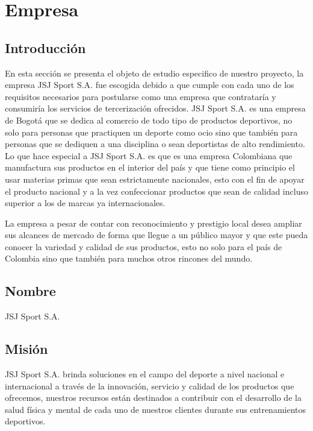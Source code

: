 \chapter{Empresa}

\section{Introducción}

En esta sección se presenta el objeto de estudio especifico de nuestro proyecto, la empresa JSJ Sport S.A. fue escogida debido a que cumple con cada uno de los requisitos necesarios para postularse como una empresa que contrataría y consumiría los servicios de tercerización ofrecidos.
\newline
JSJ Sport S.A. es una empresa de Bogotá que se dedica al comercio de todo tipo de productos deportivos, no solo para personas que practiquen un deporte como ocio sino que también para personas que se dediquen a una disciplina o sean deportistas de alto rendimiento.
Lo que hace especial a JSJ Sport S.A. es que es una empresa Colombiana que manufactura sus productos en el interior del país y que tiene como principio el usar materias primas que sean estrictamente nacionales, esto con el fin de apoyar el producto nacional y a la vez confeccionar productos que sean de calidad incluso superior a los de marcas ya internacionales.
\newline 

La empresa a pesar de contar con reconocimiento y prestigio local desea ampliar sus alcances de mercado de forma que llegue a un público mayor y que este pueda conocer la variedad y calidad de sus productos, esto no solo para el país de Colombia sino que también para muchos otros rincones del mundo.
\newpage

\section{Nombre}

JSJ Sport S.A.

\section{Misión}

JSJ Sport S.A. brinda soluciones en el campo del deporte a nivel nacional e internacional a través de la innovación, servicio y  calidad de los productos que ofrecemos, nuestros recursos están destinados a contribuir con el desarrollo de la salud física y mental de cada uno de nuestros clientes durante sus entrenamientos deportivos.

